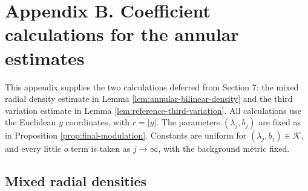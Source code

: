 \documentclass[11pt]{article}
\numberwithin{equation}{section}
\theoremstyle{remark}
\begin{document}
\label{app:proofs}
\section*{Appendix B. Coefficient calculations for the annular estimates}

{
This appendix supplies the two calculations deferred from Section  7: the
mixed radial density estimate in Lemma  \ref{lem:annular-bilinear-density}
and the third variation estimate in
Lemma  \ref{lem:reference-third-variation}. All calculations use the
Euclidean \(y\) coordinates, with \(r=|y|\). The parameters
\((\lambda_j,b_j)\) are fixed as in
Proposition  \ref{prop:final-modulation}. Constants are uniform for
\((\lambda_j,b_j)\in\mathcal K\), and every little \(o\) term is taken as
\(j\to\infty\), with the background metric fixed.
}

 \subsection*{Mixed radial densities}
\end{document}
